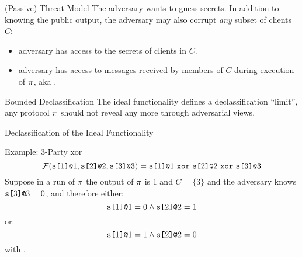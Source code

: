 \documentclass{beamer}
\begin{document}
\begin{frame}{(Passive) Threat Model}
  The adversary wants to guess secrets. In addition to knowing the public
  output, the adversary may also corrupt \emph{any} subset of clients $C$:
  \begin{itemize}
  \item adversary has access to the secrets of clients in $C$.
  \item adversary has access to messages received by members of $C$ during execution of $\pi$,
    aka .
  \end{itemize}

  \begin{alertblock}{Bounded Declassification}
    The ideal functionality defines a declassification ``limit'', any protocol $\pi$
    should not reveal any more through adversarial views.
  \end{alertblock}
\end{frame}

\begin{frame}{Declassification of the Ideal Functionality}

  \begin{exampleblock}{Example: 3-Party xor}
  $$
  \mathcal{F}(\texttt{s[}1\texttt{]}\texttt{@}1,\texttt{s[}2\texttt{]}\texttt{@}2,\texttt{s[}3\texttt{]}\texttt{@}3) =
  \texttt{s[}1\texttt{]}\texttt{@}1\ \texttt{xor}\ \texttt{s[}2\texttt{]}\texttt{@}2\ \texttt{xor}\ \texttt{s[}3\texttt{]}\texttt{@}3
  $$
  Suppose in a run of $\pi$ the output of $\pi$ is 1 and $C = \{ 3 \}$ and
  the adversary knows $\texttt{s[}3\texttt{]}\texttt{@}3 = 0$, and therefore either:
  $$
  \texttt{s[}1\texttt{]}\texttt{@}1 = 0 \wedge \texttt{s[}2\texttt{]}\texttt{@}2 = 1
  $$
  or:
  $$
  \texttt{s[}1\texttt{]}\texttt{@}1 = 1 \wedge \texttt{s[}2\texttt{]}\texttt{@}2 = 0
  $$
  with . 
  \end{exampleblock}
  
\end{frame}
\end{document}
